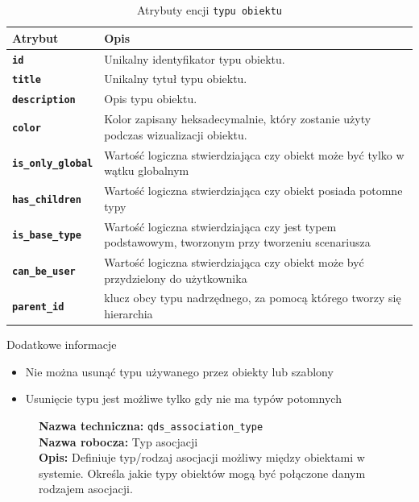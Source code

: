 \begin{table}[H]
    \centering
    \renewcommand{\arraystretch}{1.6}
    \begin{tabular}{|>{\bfseries}l|p{}|}
        \hline
        \rowcolor[HTML]{EFEFEF} \textbf{Atrybut} & \textbf{Opis} \\
        \hline
        \texttt{id} & Unikalny identyfikator typu obiektu. \\
        \hline
        \texttt{title} & Unikalny tytuł typu obiektu. \\
        \hline
        \texttt{description} & Opis typu obiektu. \\
        \hline
        \texttt{color} & Kolor zapisany heksadecymalnie, który zostanie użyty podczas wizualizacji obiektu. \\
        \hline
        \texttt{is\_only\_global} & Wartość logiczna stwierdziająca czy obiekt może być tylko w wątku globalnym \\
        \hline
        \texttt{has\_children} & Wartość logiczna stwierdziająca czy obiekt posiada potomne typy \\
        \hline
        \texttt{is\_base\_type} & Wartość logiczna stwierdziająca czy jest typem podstawowym, tworzonym przy tworzeniu scenariusza \\
        \hline
        \texttt{can\_be\_user} & Wartość logiczna stwierdziająca czy obiekt może być przydzielony do użytkownika \\
        \hline
        \texttt{parent\_id} & klucz obcy typu nadrzędnego, za pomocą którego tworzy się hierarchia \\
        \hline
    \end{tabular}
    \caption{Atrybuty encji \texttt{typu obiektu}}
\end{table}

Dodatkowe informacje
\begin{itemize}
    \item Nie można usunąć typu używanego przez obiekty lub szablony
    \item Usunięcie typu jest możliwe tylko gdy nie ma typów potomnych
\end{itemize}

\begin{figure}[H]
    \centering
    \begin{minipage}{0.8\textwidth}
        \begin{framed}
            \noindent\textbf{\large Nazwa techniczna:} \texttt{qds\_association\_type} \\
            \textbf{\large Nazwa robocza:} Typ asocjacji \\
            \textbf{\large Opis:} Definiuje typ/rodzaj asocjacji możliwy między obiektami w systemie.
            Określa jakie typy obiektów mogą być połączone danym rodzajem asocjacji.
        \end{framed}
    \end{minipage}
\end{figure}

